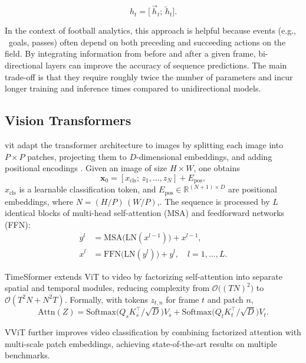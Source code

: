 \[
h_t = \bigl[\,\overrightarrow{h}_t;\,\overleftarrow{h}_t\bigr].
\]

In the context of football analytics, this approach is helpful because events (e.g., \ goals, passes) often depend on both preceding and succeeding actions on the field. By integrating information from before and after a given frame, bi-directional layers can improve the accuracy of sequence predictions. The main trade-off is that they require roughly twice the number of parameters and incur longer training and inference times compared to unidirectional models.


\subsection{Vision Transformers}
\label{ssec:vision_transformers}

\acrfull{vit} adapt the transformer architecture \cite{vaswani_attention_2017}  to images by splitting each image into $P\times P$ patches, projecting them to $D$-dimensional embeddings, and adding positional encodings \cite{dosovitskiy_image_transformer_2021}. Given an image of size $H\times W$, one obtains
\[
\mathbf{x}_0 = [x_{\text{cls}};\,z_1,\dots,z_N] + E_{\text{pos}},
\]
$x_{\text{cls}}$ is a learnable classification token, and $E_{\text{pos}}\in\mathbb{R}^{(N+1)\times D}$ are positional embeddings, where $N=(H/P)\,(W/P)$,. The sequence is processed by $L$ identical blocks of multi-head self-attention (MSA) and feedforward networks (FFN)\cite{dosovitskiy_image_transformer_2021}:
\begin{align*}
y^l &= \mathrm{MSA}\bigl(\mathrm{LN}(x^{l-1})\bigr) + x^{l-1},\\
x^l &= \mathrm{FFN}\bigl(\mathrm{LN}(y^l)\bigr) + y^l,\quad l=1,\dots,L.
\end{align*}

TimeSformer \cite{bertasius_timesformer_2021} extends ViT to video by factorizing self-attention into separate spatial and temporal modules, reducing complexity from $\mathcal{O}\bigl((TN)^2\bigr)$ to $\mathcal{O}(T^2N + N^2T)$. Formally, with tokens $z_{t,n}$ for frame $t$ and patch $n$,
\[
\mathrm{Attn}(Z)
= \mathrm{Softmax}\!\bigl(Q_sK_s^\top/\sqrt{D}\bigr)V_s
+ \mathrm{Softmax}\!\bigl(Q_tK_t^\top/\sqrt{D}\bigr)V_t.
\]

VViT \cite{arnab_vvit_2021} further improves video classification by combining factorized attention with multi-scale patch embeddings, achieving state-of-the-art results on multiple benchmarks.


